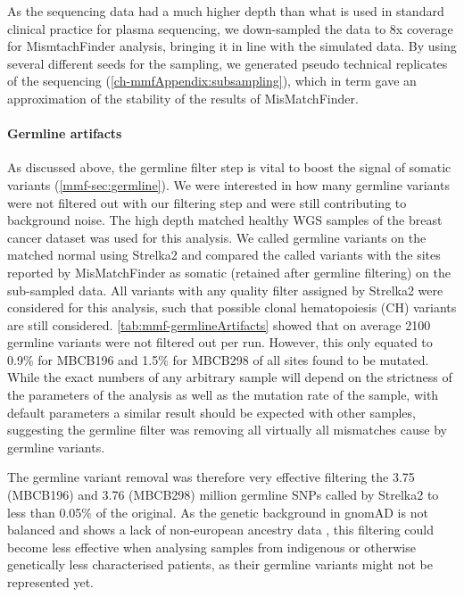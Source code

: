 As the sequencing data had a much higher depth than what is used in standard clinical practice for plasma sequencing, we down-sampled the data to 8x coverage for MismtachFinder analysis, bringing it in line with the simulated data. By using several different seeds for the sampling, we generated pseudo technical replicates of the sequencing (\autoref{ch-mmfAppendix:subsampling}), which in term gave an approximation of the stability of the results of MisMatchFinder.


\paragraph{Germline artifacts}
\label{mmf-sec:germlineArtifacts}
As discussed above, the germline filter step is vital to boost the signal of somatic variants (\autoref{mmf-sec:germline}). We were interested in how many germline variants were not filtered out with our filtering step and were still contributing to background noise. The high depth matched healthy WGS samples of the breast cancer dataset was used for this analysis. We called germline variants on the matched normal using Strelka2 and compared the called variants with the sites reported by MisMatchFinder as somatic (retained after germline filtering) on the sub-sampled data. All variants with any quality filter assigned by Strelka2 were considered for this analysis, such that possible clonal hematopoiesis (CH) variants are still considered. \autoref{tab:mmf-germlineArtifacts} showed that on average 2100 germline variants were not filtered out per run. However, this only equated to 0.9\% for MBCB196 and 1.5\% for MBCB298 of all sites found to be mutated. While the exact numbers of any arbitrary sample will depend on the strictness of the parameters of the analysis as well as the mutation rate of the sample, with default parameters a similar result should be expected with other samples, suggesting the germline filter was removing all virtually all mismatches cause by germline variants.

The germline variant removal was therefore very effective filtering the 3.75 (MBCB196) and 3.76 (MBCB298) million germline SNPs called by Strelka2 to less than 0.05\% of the original. As the genetic background in gnomAD is not balanced and shows a lack of non-european ancestry data \cite{Tiao2020}, this filtering could become less effective when analysing samples from indigenous or otherwise genetically less characterised patients, as their germline variants might not be represented yet.

